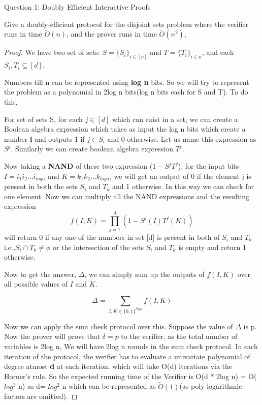 \begin{solution}{Question 1: Doubly Efficient Interactive Proofs}\label{ques:1}
    \begin{question}
    Give a doubly-efficient protocol for the disjoint sets problem where the verifier runs in time $\tilde{O}(n)$, and the prover runs in time $\tilde{O}(n^2)$,
    \end{question}
    \tcblower{}
    \begin{proof}
    We have two set of sets: $S = \{S_i\}_{i\in [n]}$ and $T = \{T_i\}_{i\in n}$, and each $S_i , T_i \subseteq [d]$.

    Numbers till n can be represented using \textbf{log n} bits. So we will try to represent the problem as a polynomial in 2log n bits(log n bits each for S and T). To do this,

    For set of sets S, for each $j \in [d]$ which can exist in a set, we can create a Boolean algebra expression which takes as input the log n bits which create a number \textbf{i} and outputs 1 if \textbf{$j \in S_i$} and 0 otherwise. Let us name this expression as $S^j$. Similarly we can create boolean algebra expression $T^j$.
    
    Now taking a \textbf{NAND} of these two expression ($1-S^jT^j$), for the input bits $I = i_1 i_2...i_{log n}$ and $K = k_1 k_2...k_{log n}$, we will get an output of 0 if the element j is present in both the sets $S_i$ and $T_k$ and 1 otherwise. In this way we can check for one element. Now we can multiply all the NAND expressions and the resulting expression $$ f(I,K)= \prod_{j=1}^d (1-S^j(I)T^j(K))$$ will return 0 if any one of the numbers in set [d] is present in both of $S_i$ and $T_k$ i.e.,$S_i \cap T_k \neq \phi$ or the intersection of the sets $S_i$ and $T_k $ is empty and return 1 otherwise. 

    Now to get the answer, $\Delta$, we can simply sum up the outputs of $f(I,K)$ over all possible values of $I$ and $K$.

    \[\Delta = \sum_{I,K\in \{0,1\}^{log n}} f(I,K)\]

    Now we can apply the sum check protocol over this. Suppose the value of $\Delta$ is p. Now the prover will prove that $\delta = p$ to the verifier. as the total number of variables is 2log n, We will have 2log n rounds in the sum check protocol. In each iteration of the protocol, the verifier has to evaluate a univariate polynomial of degree atmost \textbf{d} at each iteration. which will take O(d) iterations via the Horner's rule. So the expected running time of the Verifier is O(d * 2log n) = O($log^3$ n) as d= $log^2$ n which can be represented as $\tilde{O}(1)$(as poly logarithmic factors are omitted).


\end{proof}
\end{solution}
